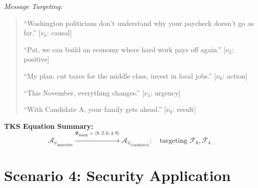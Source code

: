 \documentclass[11pt,twoside]{book}
\theoremstyle{definition}
\theoremstyle{plain}
\theoremstyle{remark}
\newcommand{\Foundations}{\mathcal{F}}
\newcommand{\noe}[1]{\nu_{#1}}
\newcommand{\PsychAttractor}{\mathcal{A}_\psi}
\newcommand{\ManipFrac}{\Phi_{\mathrm{manip}}}
\begin{document}
\begin{tcolorbox}[colback=yellow!5!white,colframe=yellow!65!black,title=\textbf{Scenario: Voter Persuasion via Attractor Analysis},breakable]
\textit{Message Targeting:}
\begin{quote}
``Washington politicians don't understand why your paycheck doesn't go as far.'' [$\noe{8}$: causal]

``Pat, we can build an economy where hard work pays off again.'' [$\noe{2}$: positive]

``My plan: cut taxes for the middle class, invest in local jobs.'' [$\noe{6}$: action]

``This November, everything changes.'' [$\noe{4}$: urgency]

``With Candidate A, your family gets ahead.'' [$\noe{9}$: result]
\end{quote}

\textbf{TKS Equation Summary:}
\begin{equation}
\boxed{
    \PsychAttractor_{\mathrm{undecided}} \xrightarrow{\ManipFrac = \langle 8:2:6:4:9 \rangle}
    \PsychAttractor_{\mathrm{Candidate A}} : \quad \text{targeting } \Foundations_6, \Foundations_4
}
\end{equation}

\end{tcolorbox}

\section{Scenario 4: Security Application}
\end{document}
